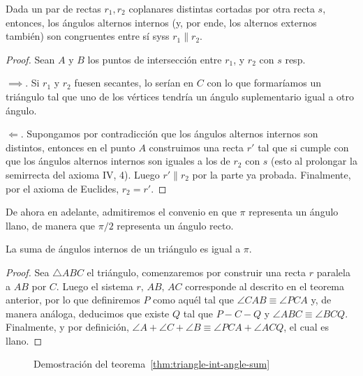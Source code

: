 \documentclass[11pt,a4paper]{book}
\begin{document}
\begin{thm}\label{thm:parallel-cross}
Dada un par de rectas $r_1,r_2$ coplanares distintas cortadas por otra recta $s$, entonces, los ángulos alternos internos (y, por ende, los alternos externos también) son congruentes entre sí syss $r_1\parallel r_2$.
\end{thm}
\begin{proof}
Sean $A$ y $B$ los puntos de intersección entre $r_1$, y $r_2$ con $s$ resp.

$\implies$. Si $r_1$ y $r_2$ fuesen secantes, lo serían en $C$ con lo que formaríamos un triángulo tal que uno de los vértices tendría un ángulo suplementario igual a otro ángulo.

$\Longleftarrow$. Supongamos por contradicción que los ángulos alternos internos son distintos, entonces en el punto $A$ construimos una recta $r'$ tal que si cumple con que los ángulos alternos internos son iguales a los de $r_2$ con $s$ (esto al prolongar la semirrecta del axioma IV, 4). Luego $r'\parallel r_2$ por la parte ya probada. Finalmente, por el axioma de Euclides, $r_2=r'$.
\end{proof}
De ahora en adelante, admitiremos el convenio en que $\pi$ representa un ángulo llano, de manera que $\pi/2$ representa un ángulo recto.
\begin{thm}\label{thm:triangle-int-angle-sum}
La suma de ángulos internos de un triángulo es igual a $\pi$.
\end{thm}
\begin{proof}
Sea $\triangle ABC$ el triángulo, comenzaremos por construir una recta $r$ paralela a $AB$ por $C$. Luego el sistema $r,\,AB,\,AC$ corresponde al descrito en el teorema anterior, por lo que definiremos $P$ como aquél tal que $\angle CAB\equiv\angle PCA$ y, de manera análoga, deducimos que existe $Q$ tal que $P-C-Q$ y $\angle ABC\equiv\angle BCQ$. Finalmente, y por definición, $\angle A+\angle C+\angle B\equiv\angle PCA+\angle ACQ$, el cual es llano.
\end{proof}
\begin{figure}
\centering
{}
\caption{Demostración del teorema~\ref{thm:triangle-int-angle-sum}}
\end{figure}
\end{document}
